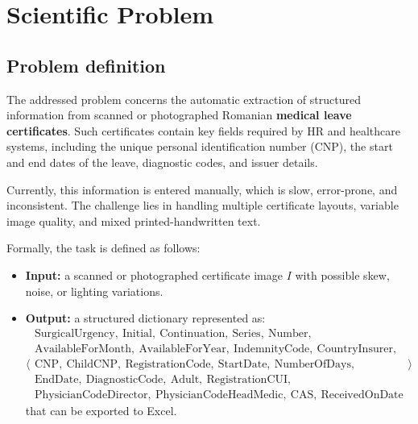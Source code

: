 \documentclass[runningheads,a4paper,11pt]{report}
\begin{document}


\chapter{Scientific Problem}
\label{chapter:scientificProblem}

\section{Problem definition}
\label{section:problemDefinition}

The addressed problem concerns the automatic extraction of structured information from scanned or photographed Romanian \textbf{medical leave certificates}.  
Such certificates contain key fields required by HR and healthcare systems, including the unique personal identification number (CNP), the start and end dates of the leave, diagnostic codes, and issuer details.

Currently, this information is entered manually, which is slow, error-prone, and inconsistent.  
The challenge lies in handling multiple certificate layouts, variable image quality, and mixed printed-handwritten text. 

\bigskip
Formally, the task is defined as follows:
\begin{itemize}
  \item \textbf{Input:} a scanned or photographed certificate image $I$ with possible skew, noise, or lighting variations.  
  \item \textbf{Output:} a structured dictionary represented as:
    \[
    \langle
    \begin{array}{l}
    \text{SurgicalUrgency},\ \text{Initial},\ \text{Continuation},\ \text{Series},\ \text{Number}, \\
    \text{AvailableForMonth},\ \text{AvailableForYear},\ \text{IndemnityCode},\ \text{CountryInsurer}, \\
    \text{CNP},\ \text{ChildCNP},\ \text{RegistrationCode},\ \text{StartDate},\ \text{NumberOfDays}, \\
    \text{EndDate},\ \text{DiagnosticCode},\ \text{Adult},\ \text{RegistrationCUI}, \\
    \text{PhysicianCodeDirector},\ \text{PhysicianCodeHeadMedic},\ \text{CAS},\ \text{ReceivedOnDate}
    \end{array}
    \rangle
    \]
    that can be exported to Excel.
\end{itemize}
\end{document}
